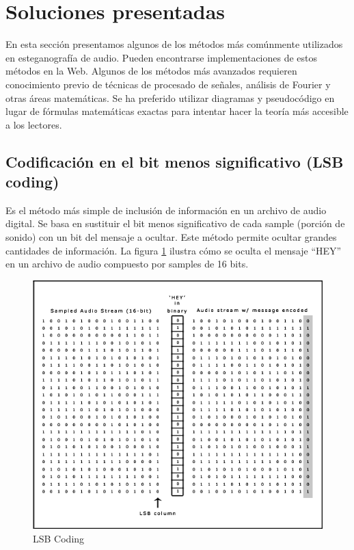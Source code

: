 \documentclass[12pt]{article}
\begin{document}
\newpage
\section{Soluciones presentadas}

En esta sección presentamos algunos de los métodos más comúnmente utilizados en esteganografía de audio. Pueden encontrarse implementaciones de estos métodos en la Web. Algunos de los métodos más avanzados requieren conocimiento previo de técnicas de procesado de señales, análisis de Fourier y otras áreas matemáticas. Se ha preferido utilizar diagramas y pseudocódigo en lugar de fórmulas matemáticas exactas para intentar hacer la teoría más accesible a los lectores.

\subsection{Codificación en el bit menos significativo (LSB coding)}

Es el método más simple de inclusión de información en un archivo de audio digital. Se basa en sustituir el bit menos significativo de cada sample (porción de sonido) con un bit del mensaje a ocultar. Este método permite ocultar grandes cantidades de información. La figura \ref{lsbcoding} ilustra cómo se oculta el mensaje ``HEY'' en un archivo de audio compuesto por samples de 16 bits.

\begin{figure}
  \centering
    \includegraphics[width=\textwidth]{img/lsbimage}
  \caption{LSB Coding}
  \label{lsbcoding}
\end{figure}
\end{document}
